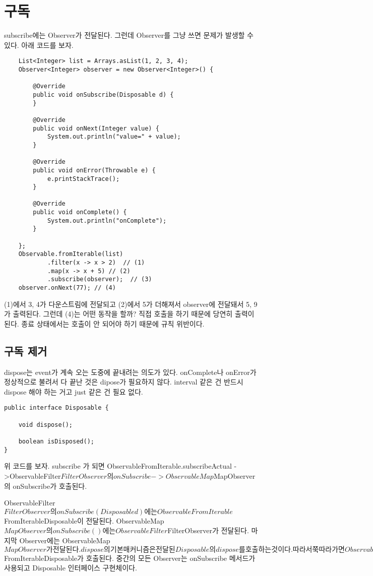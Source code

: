 \documentclass{book}
\begin{document}
\section{구독}
subscribe에는 Observer가 전달된다. 그런데 Observer를 그냥 쓰면 문제가 발생할 수 있다.
아래 코드를 보자.
\begin{verbatim}
	List<Integer> list = Arrays.asList(1, 2, 3, 4);
	Observer<Integer> observer = new Observer<Integer>() {

		@Override
		public void onSubscribe(Disposable d) {
		}

		@Override
		public void onNext(Integer value) {
			System.out.println("value=" + value);
		}

		@Override
		public void onError(Throwable e) {
			e.printStackTrace();
		}

		@Override
		public void onComplete() {
			System.out.println("onComplete");
		}

	};
	Observable.fromIterable(list)
			.filter(x -> x > 2)  // (1)
			.map(x -> x + 5) // (2)
			.subscribe(observer);  // (3)
	observer.onNext(77); // (4)		
\end{verbatim}
(1)에서 3, 4가 다운스트림에 전달되고 (2)에서 5가 더해져서 observer에 전달돼서 5, 9가 출력된다.
그런데 (4)는 어떤 동작을 할까? 
직접 호출을 하기 때문에 당연히 출력이 된다.
종료 상태에서는 호출이 안 되어야 하기 때문에 규칙 위반이다.


\subsection{구독 제거}
dispose는 event가 계속 오는 도중에 끝내려는 의도가 있다. onComplete나 onError가 정상적으로 불려서 다 끝난 것은 dipose가 필요하지 않다.
interval 같은 건 반드시 dispose  해야 하는 거고 just 같은 건 필요 없다.


\begin{verbatim}
public interface Disposable {

    void dispose();

    boolean isDisposed();
}
\end{verbatim}

위 코드를 보자.
subscribe 가 되면 
ObservableFromIterable.subscribeActual
->ObservableFilter$FilterObserver의 onSubscribe
->ObservableMap$MapObserver의 onSubscribe가 호출된다.

ObservableFilter$FilterObserver의 onSubscribe(Disposable d)에는 
ObservableFromIterable$FromIterableDisposable이 전달된다.
ObservableMap$MapObserver의 onSubscribe()에는 ObservableFilter$FilterObserver가 전달된다.
마지막 Observer에는 ObservableMap$MapObserver가 전달된다.
dispose의 기본 매커니즘은 전달된 Disposable의 dispose를 호출하는 것이다.
따라서 쭉 따라가면 ObservableFromIterable$FromIterableDisposable가  호출된다.
중간의 모든 Observer는 onSubscribe 메서드가 사용되고 Disposable 인터페이스 구현체이다.
\end{document}
